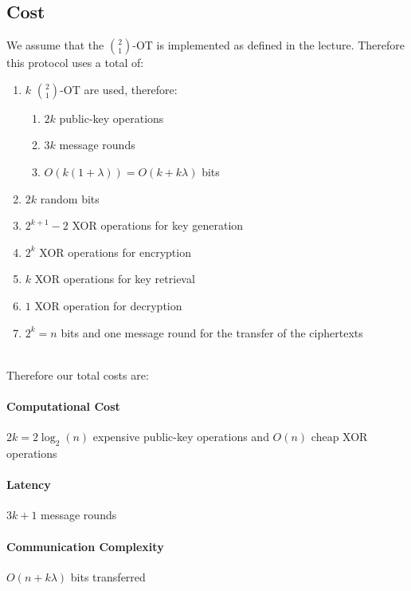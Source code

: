 \documentclass{report}
\begin{document}
		\subsection{Cost}
		\startsubsection
			We assume that the $\binom{2}{1}$-OT is implemented as defined in the lecture. Therefore this protocol uses a total of:
			\begin{enumerate}[\small \textbullet]
				\item $k$ $\binom{2}{1}$-OT are used, therefore:
				\begin{enumerate}[-]
					\item $2k$ public-key operations
					\item $3k$ message rounds
					\item $O(k(1 + \lambda)) = O(k + k \lambda)$ bits
				\end{enumerate}
				\item $2k$ random bits
				\item $2^{k+1} - 2$ XOR operations for key generation
				\item $2^k$ XOR operations for encryption
				\item $k$ XOR operations for key retrieval
				\item $1$ XOR operation for decryption
				\item $2^k = n$ bits and one message round for the transfer of the ciphertexts
			\end{enumerate}
			\hfill \\
			Therefore our total costs are:
			\paragraph{Computational Cost}
			\startsubsection
				$2k = 2 \log_{2}(n)$ expensive public-key operations and $O(n)$ cheap XOR operations
			\closesection
			\paragraph{Latency}
			\startsubsection
				$3k + 1$ message rounds
			\closesection
			\paragraph{Communication Complexity}
			\startsubsection
				$O(n + k \lambda)$ bits transferred
			\closesection
		\closesection
	\closesection
\end{document}
